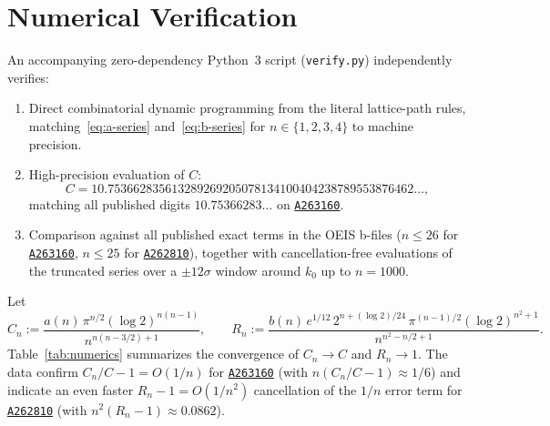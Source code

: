 \documentclass[11pt,a4paper]{article}
\theoremstyle{remark}
\newcommand{\oeis}[1]{\href{https://oeis.org/#1}{\texttt{#1}}}
\begin{document}
\section{Numerical Verification}\label{sec:numerics}

An accompanying zero-dependency Python~3 script (\texttt{verify.py}) independently verifies:
\begin{enumerate}
  \item Direct combinatorial dynamic programming from the literal lattice-path rules, matching~\eqref{eq:a-series} and~\eqref{eq:b-series} for $n\in\{1,2,3,4\}$ to machine precision.
  \item High-precision evaluation of $C$:
  \[
    C = 10.753662835613289269205078134100404238789553876462\ldots,
  \]
  matching all published digits $10.75366283\ldots$ on \oeis{A263160}.
  \item Comparison against all published exact terms in the OEIS b-files ($n\le 26$ for \oeis{A263160}, $n\le 25$ for \oeis{A262810}), together with cancellation-free evaluations of the truncated series over a $\pm 12\sigma$ window around $k_0$ up to $n=1000$.
\end{enumerate}

Let
\[
  C_n := \frac{a(n)\,\pi^{n/2}(\log 2)^{n(n-1)}}{n^{n(n-3/2)+1}},
  \qquad
  R_n := \frac{b(n)\,e^{1/12}\,2^{n+(\log 2)/24}\,\pi^{(n-1)/2}(\log 2)^{n^2+1}}{n^{n^2-n/2+1}}.
\]
Table~\ref{tab:numerics} summarizes the convergence of $C_n\to C$ and $R_n\to 1$. The data confirm $C_n/C - 1 = O(1/n)$ for \oeis{A263160} (with $n(C_n/C-1)\approx 1/6$) and indicate an even faster $R_n - 1 = O(1/n^2)$ cancellation of the $1/n$ error term for \oeis{A262810} (with $n^2(R_n-1)\approx 0.0862$).
\end{document}
